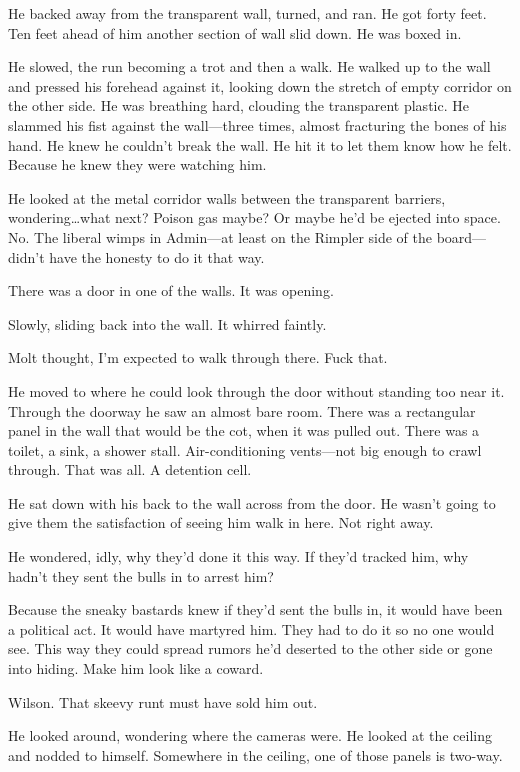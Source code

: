 He backed away from the transparent wall, turned, and ran. He got forty feet. Ten feet ahead of him another section of wall slid down. He was boxed in.

He slowed, the run becoming a trot and then a walk. He walked up to the wall and pressed his forehead against it, looking down the stretch of empty corridor on the other side. He was breathing hard, clouding the transparent plastic. He slammed his fist against the wall---three times, almost fracturing the bones of his hand. He knew he couldn't break the wall. He hit it to let them know how he felt. Because he knew they were watching him.

He looked at the metal corridor walls between the transparent barriers, wondering\ldots what next? Poison gas maybe? Or maybe he'd be ejected into space. No. The liberal wimps in Admin---at least on the Rimpler side of the board---didn't have the honesty to do it that way.

There was a door in one of the walls. It was opening.

Slowly, sliding back into the wall. It whirred faintly.

Molt thought, I'm expected to walk through there. Fuck that.

He moved to where he could look through the door without standing too near it. Through the doorway he saw an almost bare room. There was a rectangular panel in the wall that would be the cot, when it was pulled out. There was a toilet, a sink, a shower stall. Air-conditioning vents---not big enough to crawl through. That was all. A detention cell.

He sat down with his back to the wall across from the door. He wasn't going to give them the satisfaction of seeing him walk in here. Not right away.

He wondered, idly, why they'd done it this way. If they'd tracked him, why hadn't they sent the bulls in to arrest him?

Because the sneaky bastards knew if they'd sent the bulls in, it would have been a political act. It would have martyred him. They had to do it so no one would see. This way they could spread rumors he'd deserted to the other side or gone into hiding. Make him look like a coward.

Wilson. That skeevy runt must have sold him out.

He looked around, wondering where the cameras were. He looked at the ceiling and nodded to himself. Somewhere in the ceiling, one of those panels is two-way.

